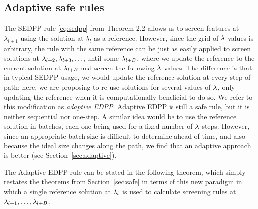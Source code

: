 \subsection{Adaptive safe rules}

The SEDPP rule \eqref{eq:sedpp} from Theorem 2.2 allows us to screen features at $\lambda_{l+1}$ using the solution at $\lambda_l$ as a reference. However, since the grid of $\lambda$ values is arbitrary, the rule with the same reference can be just as easily applied to screen solutions at $\lambda_{l+2}, \lambda_{l+3}, \ldots$, until some $\lambda_{l+B}$, where we update the reference to the current solution at $\lambda_{l+B}$ and screen the following $\lambda$ values.  The difference is that in typical SEDPP usage, we would update the reference solution at every step of path; here, we are proposing to re-use solutions for several values of $\lambda$, only updating the reference when it is computationally beneficial to do so.  We refer to this modification as \emph{adaptive EDPP}.  Adaptive EDPP is still a safe rule, but it is neither sequential nor one-step.   A similar idea would be to use the reference solution in batches, each one being used for a fixed number of $\lambda$ steps.  However, since an appropriate batch size is difficult to determine ahead of time, and also because the ideal size changes along the path, we find that an adaptive approach is better (see Section~\ref{sec:adaptive}).

The Adaptive EDPP rule can be stated in the following theorem, which simply restates the theorems from Section~\ref{sec:safe} in terms of this new paradigm in which a single reference solution at $\lambda_l$ is used to calculate screening rules at $\lambda_{l+1}, \ldots, \lambda_{l+B}$.

